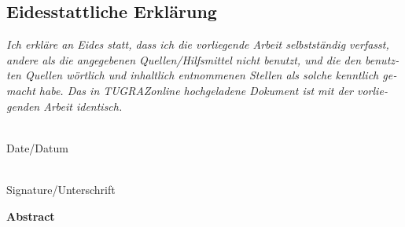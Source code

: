 \vspace{1cm}


\begin{otherlanguage}{austrian}

    \subsection*{Eidesstattliche Erklärung}
    \noindent
    \textit{
        Ich erkläre an Eides statt, dass ich die vorliegende Arbeit
        selbstständig verfasst, andere als die angegebenen Quellen/Hilfsmittel
        nicht benutzt, und die den benutzten Quellen wörtlich und inhaltlich
        entnommenen Stellen als solche kenntlich gemacht habe. Das in
        TUGRAZonline hochgeladene Dokument ist mit der vorliegenden
        Arbeit identisch.}

    \vspace{2cm}

    \noindent
    \parbox[top]{4cm}{
        \begin{center}
            \underline{\hspace*{4cm}} \\
            Date/Datum
        \end{center}
    }
    \hfill
    \parbox[top]{6cm}{
        \begin{center}
            \underline{\hspace*{6cm}} \\
            Signature/Unterschrift
        \end{center}
    }

\end{otherlanguage}






\cleardoublepage

\vspace*{2cm}

\begin{center}
    {\Large\sffamily\bfseries Abstract}
\end{center}

